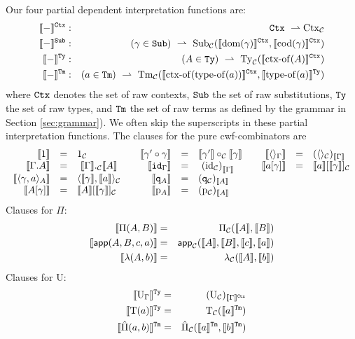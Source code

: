 \documentclass{lmcs}
\def\UU{\mathrm{U}}
\def\Ta{\mathrm{T}}
\newcommand{\intCtxU}[1]{\llbracket #1 \rrbracket^\RawCtx}
\newcommand{\intSubU}[1]{\llbracket #1 \rrbracket^\RawSub}
\newcommand{\intTyU}[1]{\llbracket #1 \rrbracket^\RawTy}
\newcommand{\intTmU}[1]{\llbracket #1 \rrbracket^\RawTm}
\begin{document}
Our four partial dependent interpretation functions are:
\begin{eqnarray*}
\intCtxU{-} &:& \RawCtx\ \rightharpoonup \Ctx_\C\\
\intSubU{-}&:& (\gamma \in \RawSub)\ \rightharpoonup \
\Sub_\C(\intCtxU{\domain(\gamma)}, \intCtxU{\codomain(\gamma)})\\
\intTyU{-}&:& (A \in \RawTy)\ \rightharpoonup\ \Ty_\C(\intCtxU{\ctxof(A)})\\
\intTmU{-}&:& (a \in\RawTm)\ \rightharpoonup\
\Tm_\C (\intCtxU{\ctxof(\typeof(a))}, \intTyU{\typeof(a)})
\end{eqnarray*}
where ${\tt Ctx}$ denotes the set of raw contexts, ${\tt Sub}$ the set of raw substitutions, ${\tt Ty}$ the set of raw types, and ${\tt Tm}$ the set of raw terms as defined by the grammar in Section \ref{sec:grammar}). 
We often skip the superscripts in these partial interpretation functions. The clauses for the pure cwf-combinators are
\[
\begin{array}{rclcrclcrcl}
\llbracket 1 \rrbracket &=& 1_{\mathcal C} 						&&
\llbracket \gamma' \circ \gamma \rrbracket &= & \llbracket \gamma' \rrbracket \circ_{\mathcal C} \llbracket \gamma \rrbracket&&
\llbracket  \langle  \rangle_ \Gamma   \rrbracket &=&  (\langle  \rangle_{\mathcal C}) _{ \llbracket \Gamma \rrbracket  }
\\
\llbracket  \Gamma .A \rrbracket &=& \ \llbracket \Gamma \rrbracket ._{\mathcal C} \llbracket A \rrbracket	&&
\llbracket {\tt id}_{\Gamma} \rrbracket & = &\ {(\mathrm{id}_{\mathcal C})}_{\llbracket \Gamma \rrbracket}	&&
\llbracket a[\gamma] \rrbracket &=& \llbracket a \rrbracket[\llbracket \gamma \rrbracket]_{\mathcal C}
\\
\llbracket  \langle  \gamma , a \rangle_A  \rrbracket &=& \langle \llbracket \gamma \rrbracket , \llbracket a \rrbracket \rangle_{\mathcal C}&&
\llbracket {\tt q}_A \rrbracket &= & ({\tt q}_{\mathcal C})_{\llbracket A \rrbracket}
\\
\llbracket A[\gamma] \rrbracket &=& \llbracket A \rrbracket [\llbracket \gamma \rrbracket]_{\mathcal C}		&&
\llbracket \mathrm{p}_A \rrbracket &= & (\mathrm{p}_{\mathcal C})_{\llbracket A \rrbracket} 
\end{array}
\]
Clauses for $\Pi$:
\begin{eqnarray*}
\llbracket \Pi(A,B) \rrbracket &=& \Pi_{\mathcal C}(\llbracket A \rrbracket,\llbracket B \rrbracket)\\
\llbracket \mathsf{app}(A,B,c,a) \rrbracket &=& \mathsf{app}_{\mathcal C}(\llbracket A \rrbracket,\llbracket B \rrbracket,\llbracket c \rrbracket,\llbracket a \rrbracket)\\
\llbracket \lambda(A,b) \rrbracket &=& \lambda_{\mathcal C}(\llbracket A \rrbracket,\llbracket b \rrbracket)
\end{eqnarray*}
Clauses for $\UU$:
\begin{eqnarray*}
\intTyU{\UU_\Gamma} &=& (\UU_\C)_{\intCtxU{\Gamma}}\\
\intTyU{\Ta(a)} &=& \Ta_\C(\intTmU{a})\\
\intTmU{\hat{\Pi}(a,b)}&=& \hat{\Pi}_\C(\intTmU{a},\intTmU{b})
\end{eqnarray*}
\end{document}
